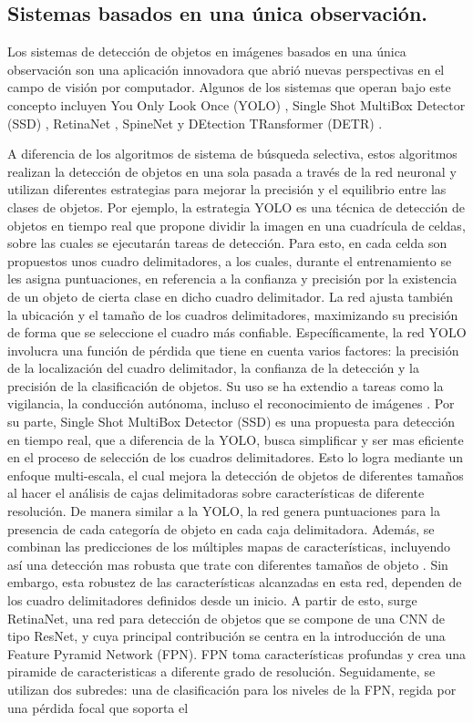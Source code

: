 \subsection{Sistemas basados en una única observación. }Los sistemas de detección de objetos en imágenes basados en una única observación son una aplicación innovadora que abrió nuevas perspectivas en el campo de visión por computador. Algunos de los sistemas que operan bajo este concepto incluyen You Only Look Once (YOLO) , Single Shot MultiBox Detector (SSD) , RetinaNet , SpineNet  y DEtection TRansformer (DETR) . \par

A diferencia de los algoritmos de sistema de búsqueda selectiva, estos algoritmos realizan la detección de objetos en una sola pasada a través de la red neuronal y utilizan diferentes estrategias para mejorar la precisión y el equilibrio entre las clases de objetos. Por ejemplo, la estrategia YOLO es una técnica de detección de objetos en tiempo real que propone dividir la imagen en una cuadrícula de celdas, sobre las cuales se ejecutarán tareas de detección. Para esto, en cada celda son propuestos unos cuadro delimitadores, a los cuales, durante el entrenamiento se les asigna puntuaciones, en referencia a la confianza y precisión por la existencia de un objeto de cierta clase en dicho cuadro delimitador. La red ajusta también la ubicación y el tamaño de los cuadros delimitadores, maximizando su precisión de forma que se seleccione el cuadro más confiable. Específicamente, la red YOLO involucra una función de pérdida que tiene en cuenta varios factores: la precisión de la localización del cuadro delimitador, la confianza de la detección y la precisión de la clasificación de objetos. Su uso se ha extendio a tareas como la vigilancia, la conducción autónoma, incluso el reconocimiento de imágenes . Por su parte, Single Shot MultiBox Detector (SSD) es una propuesta para detección en tiempo real, que a diferencia de la YOLO, busca simplificar y ser mas eficiente en el proceso de selección de los cuadros delimitadores. Esto lo logra mediante un enfoque multi-escala, el cual mejora la detección de objetos de diferentes tamaños al hacer el análisis de cajas delimitadoras sobre características de diferente resolución. De manera similar a la YOLO, la red genera puntuaciones para la presencia de cada categoría de objeto en cada caja delimitadora. Además, se combinan las predicciones de los múltiples mapas de características, incluyendo así una detección mas robusta que trate con diferentes tamaños de objeto . Sin embargo, esta robustez de las características alcanzadas en esta red, dependen de los cuadro delimitadores definidos desde un inicio. A partir de esto, surge RetinaNet, una red para detección de objetos que se compone de una CNN  de tipo ResNet, y cuya principal contribución se centra en la introducción de una Feature Pyramid Network (FPN). FPN toma características profundas y crea una piramide de caracteristicas a diferente grado de resolución. Seguidamente, se utilizan dos subredes: una de clasificación para los niveles de la FPN, regida por una pérdida focal que soporta el 